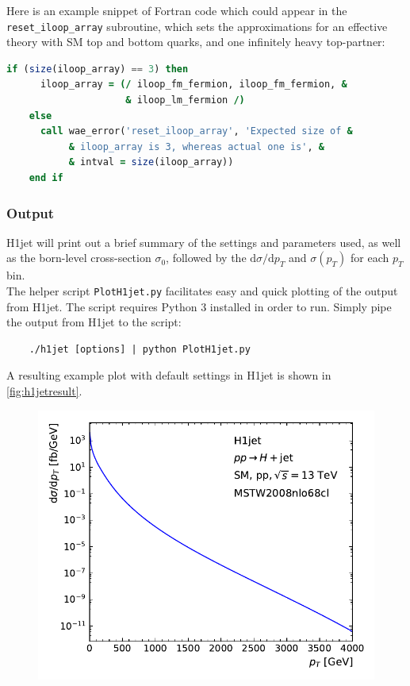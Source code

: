 \documentclass[12pt,a4wide]{article}
\begin{document}
Here is an example snippet of Fortran code which could appear in the \texttt{reset\_iloop\_array} subroutine, which sets the approximations for an effective theory with SM top and bottom quarks, and one infinitely heavy top-partner: 
\begin{lstlisting}[language=Fortran, 
                   keywordstyle=\color{Red},
                   stringstyle=\color{Green},
                   identifierstyle=\color{Blue},
                   showstringspaces=false]
    if (size(iloop_array) == 3) then
      iloop_array = (/ iloop_fm_fermion, iloop_fm_fermion, &
                     & iloop_lm_fermion /)
    else
      call wae_error('reset_iloop_array', 'Expected size of &
           & iloop_array is 3, whereas actual one is', &
           & intval = size(iloop_array))
    end if
\end{lstlisting}

\subsubsection{Output}
H1jet will print out a brief summary of the settings and parameters used, as well as the born-level cross-section $\sigma_0$, followed by the $\mathrm{d}\sigma/\mathrm{d}p_{T}$ and $\sigma(p_{T})$ for each $p_T$ bin. \\ 

The helper script \texttt{PlotH1jet.py} facilitates easy and quick plotting of the output from H1jet. The script requires Python 3 installed in order to run. Simply pipe the output from H1jet to the script: 
\begin{lstlisting}
	./h1jet [options] | python PlotH1jet.py 
\end{lstlisting}
A resulting example plot with default settings in H1jet is shown in \autoref{fig:h1jetresult}. 

\begin{figure}[tbh] 
  \centering
  \includegraphics[width=0.6\linewidth]{figures/h1jetresult}
  \label{fig:h1jetresult}
\end{figure}
\end{document}
